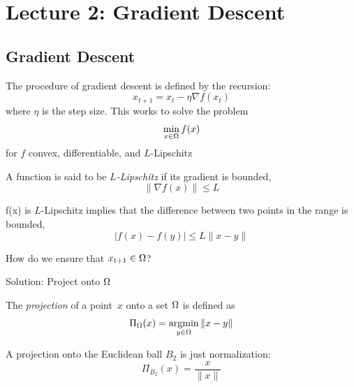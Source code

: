 \section{Lecture 2: Gradient Descent}

\subsection{Gradient Descent}

The procedure of gradient descent is defined by the recursion:
\[
x_{t+1} = x_t - \eta \nabla f(x_t)
\]
where $\eta$ is the step size. This works to solve the problem
\[
\min_{x\in\Omega} f(x)
\]
for $f$ convex, differentiable, and $L$-Lipschitz

\begin{definition}[$L$-Lipschitz]
A function is said to be \emph{$L$-Lipschitz} if its gradient is bounded,
\[
\|\nabla f(x)\| \leq L
\]
\end{definition}

\begin{fact}
f(x) is $L$-Lipschitz implies that the difference between two points in the range is bounded,
\[
|f(x) - f(y)| \leq L \|x - y\|
\]
\end{fact}

\begin{question}
How do we ensure that $x_{t+1}\in\Omega$?
\end{question}

Solution: Project onto $\Omega$

\begin{definition}[Projection]
The \emph{projection} of a point~$x$ onto a set $\Omega$ is defined as
\[
\Pi_{\Omega}(x) = \operatorname*{\arg\!\min}_{y\in\Omega} \|x-y\|
\]
\end{definition}

\begin{example}
A projection onto the Euclidean ball $B_2$ is just normalization:
\[
\Pi_{B_2}(x) = \dfrac{x}{\|x\|}
\]
\end{example}

